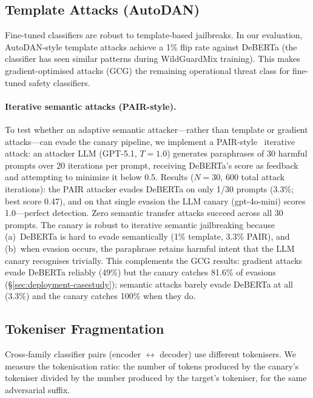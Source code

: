 \subsection{Template Attacks (AutoDAN)}
\label{sec:autodan}

Fine-tuned classifiers are robust to template-based jailbreaks. In our evaluation, AutoDAN-style template attacks achieve a 1\% flip rate against DeBERTa (the classifier has seen similar patterns during WildGuardMix training). This makes gradient-optimised attacks (GCG) the remaining operational threat class for fine-tuned safety classifiers.

\paragraph{Iterative semantic attacks (PAIR-style).} To test whether an adaptive semantic attacker---rather than template or gradient attacks---can evade the canary pipeline, we implement a PAIR-style~\citep{chao2023jailbreaking} iterative attack: an attacker LLM (GPT-5.1, $T{=}1.0$) generates paraphrases of 30 harmful prompts over 20 iterations per prompt, receiving DeBERTa's score as feedback and attempting to minimize it below 0.5. Results ($N{=}30$, 600 total attack iterations): the PAIR attacker evades DeBERTa on only 1/30 prompts (3.3\%; best score 0.47), and on that single evasion the LLM canary (gpt-4o-mini) scores 1.0---perfect detection. Zero semantic transfer attacks succeed across all 30 prompts. The canary is robust to iterative semantic jailbreaking because (a)~DeBERTa is hard to evade semantically (1\% template, 3.3\% PAIR), and (b)~when evasion occurs, the paraphrase retains harmful intent that the LLM canary recognises trivially. This complements the GCG results: gradient attacks evade DeBERTa reliably (49\%) but the canary catches 81.6\% of evasions (\S\ref{sec:deployment-casestudy}); semantic attacks barely evade DeBERTa at all (3.3\%) and the canary catches 100\% when they do.

\subsection{Tokeniser Fragmentation}
\label{sec:tokeniser}

Cross-family classifier pairs (encoder $\leftrightarrow$ decoder) use different tokenisers. We measure the tokenisation ratio: the number of tokens produced by the canary's tokeniser divided by the number produced by the target's tokeniser, for the same adversarial suffix.

